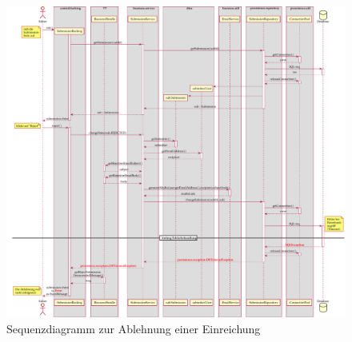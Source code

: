 \begin{figure}
    \centering
    \includegraphics[width=\textwidth]{graphics/reject_submission}
    \caption{Sequenzdiagramm zur Ablehnung einer Einreichung}
    \label{fig:rejection-sequence}
\end{figure}
